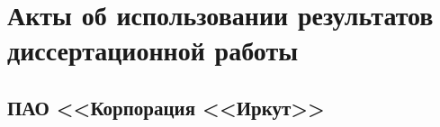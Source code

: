 \chapter{Акты об использовании результатов диссертационной работы} \label{struct:acts} 





\section{ПАО <<Корпорация <<Иркут>>}

